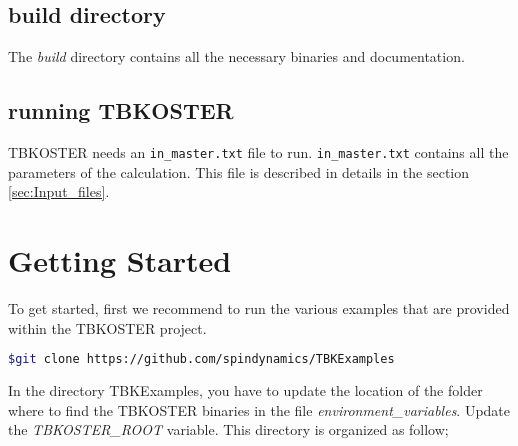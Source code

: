 \documentclass[12pt, onecolumn]{memoir}
\newcommand{\TBK}{\textcolor{nicered}{TBKOSTER}}
\begin{document}
\section{build directory}

The \textit{build} directory contains all the necessary binaries and documentation.

\section{running TBKOSTER}
\label{sec:Running}

{\TBK} needs an \verb+in_master.txt+ file to run. 
\verb+in_master.txt+ contains all the parameters of the calculation. 
This file is described in details in the section \ref{sec:Input_files}.

\vfil
\pagebreak

\chapter{Getting Started}
\label{sec:Getting_Started}

To get started, first we recommend to run the various examples that are provided within the TBKOSTER project.
\begin{lstlisting}[language=bash,basicstyle=\small\ttfamily,frame=single,breaklines=true]
$git clone https://github.com/spindynamics/TBKExamples 
\end{lstlisting}
In the directory TBKExamples, you have to update the location of the folder where to find the TBKOSTER binaries in the file 
\textit{environment\_variables}.
Update the {\textit{TBKOSTER\_ROOT}} variable.
This directory is organized as follow;

\vspace{0.5cm}

\noindent
{}
\end{document}
